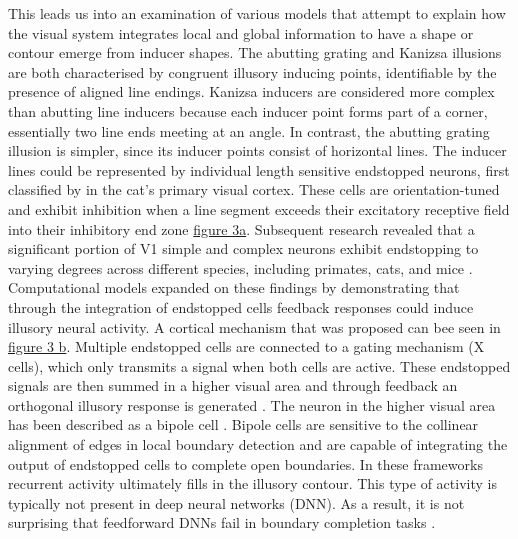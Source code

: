 \documentclass[12pt]{article}
\begin{document}
This leads us into an examination of various models that attempt to explain how the visual system integrates local and global information to have a shape or contour emerge from inducer shapes. The abutting grating and Kanizsa illusions are both characterised by congruent illusory inducing points, identifiable by the presence of aligned line endings. Kanizsa inducers are considered more complex than abutting line inducers because each inducer point forms part of a corner, essentially two line ends meeting at an angle. In contrast, the abutting grating illusion is simpler, since its inducer points consist of horizontal lines. The inducer lines could be represented by individual length sensitive endstopped neurons, first classified by \textcite{hubelRECEPTIVEFIELDSFUNCTIONAL1965} in the cat's primary visual cortex. These cells are orientation-tuned and exhibit inhibition when a line segment exceeds their excitatory receptive field into their inhibitory end zone \hyperref[fig:endstop_mechanism]{figure 3a}. Subsequent research revealed that a significant portion of V1 simple and complex neurons exhibit endstopping to varying degrees across different species, including primates, cats, and mice \autocite{deangelisLengthWidthTuning1994,jonesSurroundSuppressionPrimate2001,sceniakVisualSpatialCharacterization2001}. Computational models expanded on these findings by demonstrating that through the integration of endstopped cells feedback responses could induce illusory neural activity. A cortical mechanism that was proposed can bee seen in \hyperref[fig:endstop_mechanism]{figure 3 b}. Multiple endstopped cells are connected to a gating mechanism (X cells), which only transmits a signal when both cells are active. These endstopped signals are then summed in a higher visual area and through feedback an orthogonal illusory response is generated \autocite{vonderheydtIllusoryContoursCortical1984}. The neuron in the higher visual area has been described as a bipole cell \textcite{grossbergRoleIllusoryContours1987}.  Bipole cells are sensitive to the collinear alignment of edges in local boundary detection and are capable of integrating the output of endstopped cells to complete open boundaries. In these frameworks recurrent activity ultimately fills in the illusory contour. This type of activity is typically not present in deep neural networks (DNN). As a result, it is not surprising that feedforward DNNs fail in boundary completion tasks \autocite{fanChallengingDeepLearning2023}.  
\end{document}
